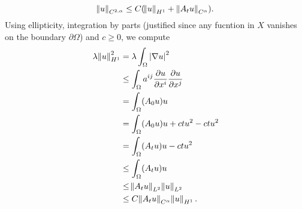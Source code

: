 \begin{equation*}
	\norm{u}_{C^{2,\alpha}} \leq C(\norm{u}_{H^1} + \norm[0]{A_tu}_{C^\alpha}).
\end{equation*}
Using ellipticity, integration by parts (justified since any fucntion in $X$ vanishes on the boundary $\partial \Omega$) and $c \geq 0$, we compute
\begin{align*}
	\lambda\norm{u}_{H^1}^2 &= \lambda\int_{\Omega}\abs[0]{\nabla u}^2\\
	&\leq \int_{\Omega} a^{ij} \frac{\partial u}{\partial x^i}\frac{\partial u}{\partial x^j}\\
	&= \int_\Omega (A_0u)u\\
	&= \int_\Omega (A_0u)u + ctu^2 - ctu^2\\
	&= \int_\Omega (A_tu)u - ctu^2\\
	&\leq \int_\Omega (A_tu)u\\
	&\leq \norm{A_tu}_{L^2}\norm{u}_{L^2}\\
	&\leq C\norm{A_tu}_{C^\alpha}\norm{u}_{H^1}.
\end{align*}

